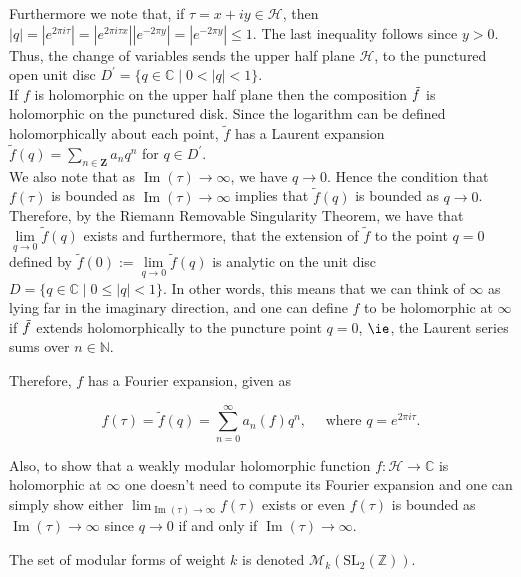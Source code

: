 \begin{remark}
Furthermore we note that, if $\tau=x+i y \in \mathcal{H}$, then
$
|q|=|e^{2 \pi i \tau}|=|e^{2 \pi i \tau x}||e^{-2 \pi y}|=|e^{-2 \pi y}| \leq 1.
$
The last inequality follows since $y>0$. Thus, the change of variables sends the upper half plane $\mathcal{H}$, to the punctured open unit disc $D^{\prime}=\{q \in \mathbb{C} \mid 0<| q \mid<1\}$. \\
If $f$ is holomorphic on the upper half plane then the composition $\Tilde{f}$ is holomorphic on the punctured disk. Since the logarithm can be defined holomorphically about each point, $\tilde{f}$ has a Laurent expansion $\tilde{f}(q)=\sum_{n \in \mathbf{Z}} a_{n} q^{n}$ for $q \in D^{\prime}$.\\
We also note that as $\operatorname{Im}(\tau) \rightarrow \infty$, we have $q \rightarrow 0$. Hence the condition that $f(\tau)$ is bounded as $\operatorname{Im}(\tau) \rightarrow \infty$ implies that $\tilde{f}(q)$ is bounded as $q \rightarrow 0$. Therefore, by the Riemann Removable Singularity Theorem, we have that $\lim\limits_{q \to 0} \tilde{f}(q)$ exists and furthermore, that the extension of $\tilde{f}$ to the point $q=0$ defined by $\tilde{f}(0):=\lim\limits_{q \to 0} \tilde{f}(q)$ is analytic on the unit disc $D=\{q \in \mathbb{C}\mid 0 \leq| q \mid<1\}$. In other words, this means that we can think of $\infty$ as lying far in the imaginary direction, and one can define $f$ to be holomorphic at $\infty$ if $\Tilde{f}$ extends holomorphically to the puncture point $q=0$, $\ie$, the Laurent series sums over $n \in \mathbb{N}$.

Therefore, $f$ has a Fourier expansion, given as

$$
f(\tau)=\tilde{f}(q)=\sum_{n=0}^{\infty} a_{n}(f) q^{n}, \quad \text { where } q=e^{2 \pi i \tau}.
$$

 Also, to show that a weakly modular holomorphic function $f: \mathcal{H} \longrightarrow \mathbb{C}$ is holomorphic at $\infty$ one doesn't need to compute its Fourier expansion and one can simply show either $\lim _{\operatorname{Im}(\tau) \rightarrow \infty} f(\tau)$ exists or even $f(\tau)$ is bounded as $\operatorname{Im}(\tau) \rightarrow \infty$ since $q \rightarrow 0$ if and only if $\operatorname{Im}(\tau) \rightarrow \infty$.
\end{remark}

\begin{definition}
The set of modular forms of weight $k$ is denoted $\mathcal{M}_{k}\left(\mathrm{SL}_{2}(\mathbb{Z})\right)$.
\end{definition}


